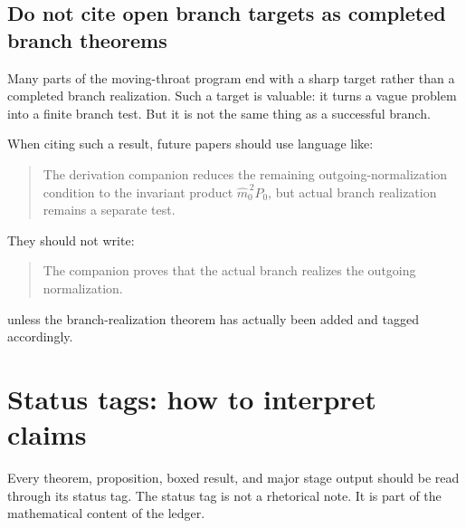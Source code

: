 \subsection{Do not cite open branch targets as completed branch theorems}
\label{subsec:do-not-cite-open-as-complete}

Many parts of the moving-throat program end with a sharp target rather than a completed branch realization.  Such a target is valuable: it turns a vague problem into a finite branch test.  But it is not the same thing as a successful branch.

When citing such a result, future papers should use language like:
\begin{quote}
The derivation companion reduces the remaining outgoing-normalization condition to the invariant product \(\widehat m_0^{\,2}P_0\), but actual branch realization remains a separate test.
\end{quote}

They should not write:
\begin{quote}
The companion proves that the actual branch realizes the outgoing normalization.
\end{quote}

unless the branch-realization theorem has actually been added and tagged accordingly.

\section{Status tags: how to interpret claims}
\label{sec:how-to-read-status-tags}

Every theorem, proposition, boxed result, and major stage output should be read through its status tag.  The status tag is not a rhetorical note.  It is part of the mathematical content of the ledger.

